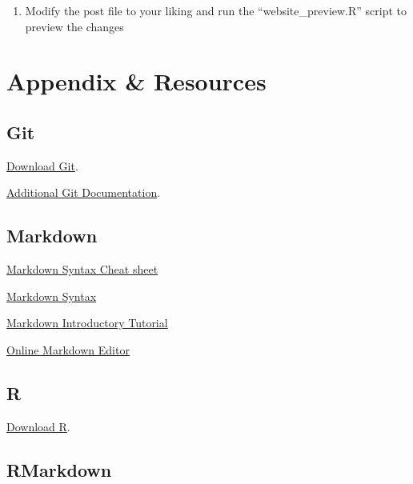 \documentclass[
]{book}
\providecommand{\tightlist}{%
  \setlength{\itemsep}{0pt}\setlength{\parskip}{0pt}}
\begin{document}
\begin{enumerate}
\def\labelenumi{\arabic{enumi}.}
\setcounter{enumi}{2}
\tightlist
\item
  Modify the post file to your liking and run the ``website\_preview.R'' script to preview the changes
\end{enumerate}

\hypertarget{appendix-resources}{%
\chapter*{Appendix \& Resources}\label{appendix-resources}}

\hypertarget{git}{%
\section*{Git}\label{git}}

\href{https://git-scm.com/downloads}{Download Git}.

\href{https://git-scm.com/doc}{Additional Git Documentation}.

\hypertarget{markdown}{%
\section*{Markdown}\label{markdown}}

\href{https://www.markdownguide.org/cheat-sheet/}{Markdown Syntax Cheat sheet}

\href{https://www.markdownguide.org/basic-syntax}{Markdown Syntax}

\href{https://www.markdowntutorial.com/lesson/1/}{Markdown Introductory Tutorial}

\href{https://markdown-editor.github.io/}{Online Markdown Editor}

\hypertarget{r}{%
\section*{R}\label{r}}

\href{https://cloud.r-project.org/}{Download R}.

\hypertarget{rmarkdown}{%
\section*{RMarkdown}\label{rmarkdown}}
\end{document}
